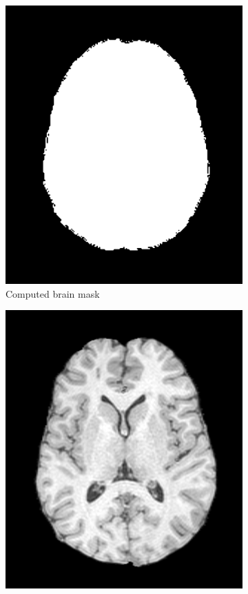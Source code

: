 \documentclass{standalone}
\begin{document}
\begin{figure}[h!]
\begin{subfigure}[b]{0.325\textwidth}
             \includegraphics[scale=0.105]{img/Chap2/brain_mask.png}
             \caption{Computed brain mask}
             \label{fig:brain_mask}
        \end{subfigure}
        \hfill
        \begin{subfigure}[b]{0.325\textwidth}
             \includegraphics[scale=0.105]{img/Chap2/brain.jpg}

\end{subfigure}
\end{figure}
\end{document}
